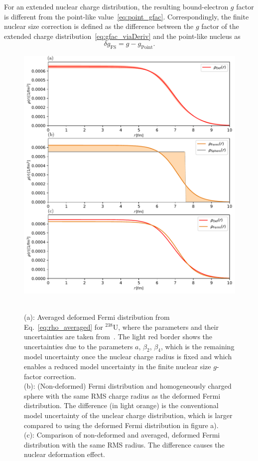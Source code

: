 For an extended nuclear charge distribution, the resulting bound-electron $g$ factor is different from the point-like value~\eqref{eq:point_gfac}. Correspondingly, the finite nuclear size correction is defined as the difference between the $g$ factor of the extended charge distribution~\eqref{eq:gfac_viaDeriv} and the point-like nucleus as
\begin{equation}
\delta g_{\text{FS}}=g-g_{\text{Point}}.
\end{equation}
%
\begin{figure}
\centering
\includegraphics[width=\textwidth]{pics/chargeDistr2.pdf}\\
\caption{\label{fig:charge distr.}\\
(a): Averaged deformed Fermi distribution from Eq.~\ref{eq:rho_averaged} for $^{238}$U, where the parameters and their uncertainties are taken from~\cite{jacek2012}. The light red border shows the uncertainties due to the parameters $a$, $\beta_2$, $\beta_4$, which is the remaining model uncertainty once the nuclear charge radius is fixed and which enables a reduced model uncertainty in the finite nuclear size $g$-factor correction.\\
(b): (Non-deformed) Fermi distribution and homogeneously charged sphere with the same RMS charge radius as the deformed Fermi distribution. The difference (in light orange) is the conventional model uncertainty of the unclear charge distribution, which is larger compared to using the deformed Fermi distribution in figure a).\\
(c): Comparison of non-deformed and averaged, deformed Fermi distribution with the same RMS radius. The difference causes the nuclear deformation effect.}
\end{figure}
%
